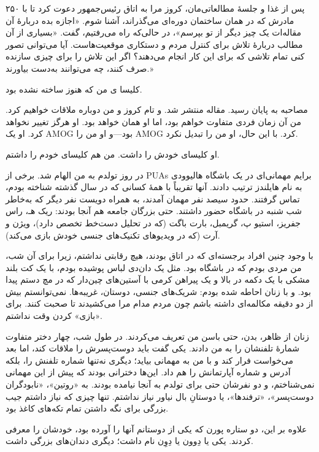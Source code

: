 ۲۵۰
پس از غذا و جلسهٔ مطالعاتی‌مان، کروز مرا به اتاق رئیس‌جمهور دعوت کرد تا با مادرش که در همان ساختمان دوره‌ای می‌گذراند، آشنا شوم. «اجازه بده دربارهٔ آن مقاله‌ات یک چیز دیگر از تو بپرسم»، در حالی‌که راه می‌رفتیم، گفت. «بسیاری از آن مطالب دربارهٔ تلاش برای کنترل مردم و دستکاری موقعیت‌هاست. آیا می‌توانی تصور کنی تمام تلاشی که برای این کار انجام می‌دهند؟ اگر این تلاش را برای چیزی سازنده صرف کنند، چه می‌توانند به‌دست بیاورند.»

کلیسا ی من که هنوز ساخته نشده بود.

مصاحبه به پایان رسید. مقاله منتشر شد. و تام کروز و من دوباره ملاقات خواهیم کرد. من آن زمان فردی متفاوت خواهم بود، اما او همان خواهد بود. او هرگز تغییر نخواهد کرد. او یک AMOG بود—و او من را AMOG کرد. با این حال، او من را تبدیل نکرد.

او کلیسای خودش را داشت. من هم کلیسای خودم را داشتم.

در روز تولدم به من الهام شد. برخی از PUAs برایم مهمانی‌ای در یک باشگاه هالیوودی به نام هایلندز ترتیب دادند. آنها تقریباً با همهٔ کسانی که در سال گذشته شناخته بودم، تماس گرفتند. حدود سیصد نفر مهمان آمدند، به همراه دویست نفر دیگر که به‌خاطر شب شنبه در باشگاه حضور داشتند. حتی بزرگان جامعه هم آنجا بودند: ریک هـ، راس جفریز، استیو پ، گریمبل، بارت باگت (که در تحلیل دست‌خط تخصص دارد)، ویژن و آرت (که در ویدیوهای تکنیک‌های جنسی خودش بازی می‌کند).

با وجود چنین افراد برجسته‌ای که در اتاق بودند، هیچ رقابتی نداشتم، زیرا برای آن شب، من مردی بودم که در باشگاه بود. مثل یک دان‌دی لباس پوشیده بودم، با یک کت بلند مشکی با یک دکمه در بالا و یک پیراهن کرمی با آستین‌های چین‌دار که در مچ دستم پیدا بود. و با زنان احاطه شده بودم: شریک‌های جنسی، دوستان، غریبه‌ها. نمی‌توانستم بیش از دو دقیقه مکالمه‌ای داشته باشم چون مردم مدام مرا می‌کشیدند تا صحبت کنند. برای «بازی» کردن وقت نداشتم.

زنان از ظاهر، بدن، حتی باسن من تعریف می‌کردند. در طول شب، چهار دختر متفاوت شمارهٔ تلفنشان را به من دادند. یکی گفت باید دوست‌پسرش را ملاقات کند، اما بعد می‌خواست فرار کند و با من به مهمانی بیاید؛ دیگری نه‌تنها شماره تلفنش را، بلکه آدرس و شماره آپارتمانش را هم داد. این‌ها دخترانی بودند که پیش از این مهمانی نمی‌شناختم، و دو نفرشان حتی برای تولدم به آنجا نیامده بودند. به «روتین»، «نابودگران دوست‌پسر»، «ترفندها»، یا دوستانِ بال نیاور نیاز نداشتم. تنها چیزی که نیاز داشتم جیب بزرگی برای نگه داشتن تمام تکه‌های کاغذ بود.

علاوه‌ بر این، دو ستاره پورن که یکی از دوستانم آنها را آورده بود، خودشان را معرفی کردند. یکی یا دِوون یا دِوِن نام داشت؛ دیگری دندان‌های بزرگی داشت.